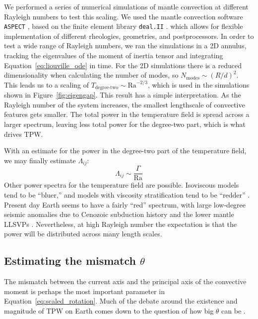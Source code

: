 \documentclass[extra,mreferee]{gji}
\begin{document}
We performed a series of numerical simulations of mantle convection at different Rayleigh numbers to test this scaling.
We used the mantle convection software \texttt{ASPECT} \citep{kronbichler2012high}, based on the finite element library \texttt{deal.II} \citep{dealII82}.
which allows for flexible implementation of different rheologies, geometries, and postprocessors.
In order to test a wide range of Rayleigh numbers, we ran the simulations in a 2D annulus, tracking the eigenvalues of the 
moment of inertia tensor and integrating Equation~\eqref{eq:liouville_ode} in time.
For the 2D simulations there is a reduced dimensionality when calculating the number of modes,
so $N_\text{modes} \sim \left(R/d \right)^2$.  This leads us to a scaling of $T_{\text{degree-two}} \sim \mathrm{Ra}^{-2/3}$, which is used in the simulations shown in Figure~\ref{fig:eigengap}.
This result has a simple interpretation.
As the Rayleigh number of the system increases, the smallest lengthscale of convective features gets smaller.
The total power in the temperature field is spread across a larger spectrum, leaving less total power for the degree-two part, which is what drives TPW.


With an estimate for the power in the degree-two part of the temperature field, we may finally estimate $\Lambda_{ij}$:
\begin{equation}
\Lambda_{ij} \sim \frac{\Gamma}{\mathrm{Ra} }
\end{equation}
Other power spectra for the temperature field are possible. Isoviscous models tend to be ``bluer,'' and models with viscosity stratification tend to be ``redder'' \citep{richards1999polar}.
Present day Earth seems to have a fairly ``red'' spectrum, with large low-degree seismic anomalies due to 
Cenozoic subduction history and the lower mantle LLSVPs \citep{dziewonski2010mantle}.
Nevertheless, at high Rayleigh number the expectation is that the power will be distributed across many length scales.


\subsection{Estimating the mismatch $\theta$}
\label{sec:theta}

The mismatch between the current axis and the principal axis of the convective moment is perhaps the most important parameter in Equation~\eqref{eq:scaled_rotation}.  
Much of the debate around the existence and magnitude of TPW on Earth comes down to the question of how big $\theta$ can be \citep{kirschvink1997evidence, steinberger1997changes}.
\end{document}
